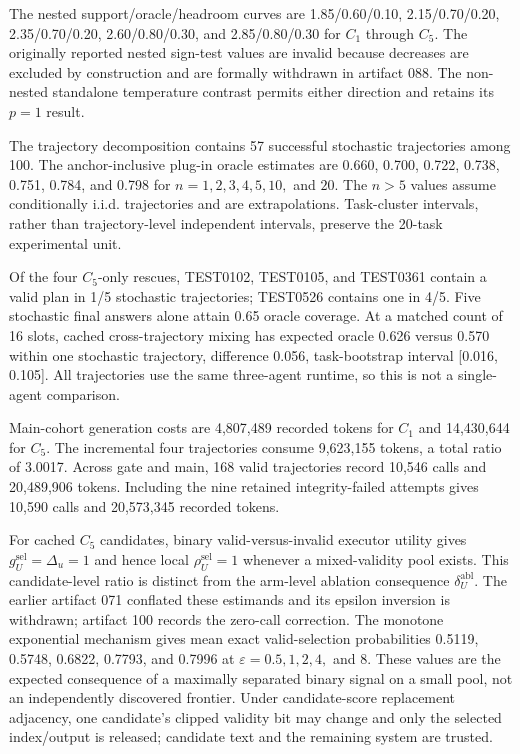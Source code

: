 The nested support/oracle/headroom curves are 1.85/0.60/0.10, 2.15/0.70/0.20, 2.35/0.70/0.20, 2.60/0.80/0.30, and 2.85/0.80/0.30 for \(C_1\) through \(C_5\). The originally reported nested sign-test values are invalid because decreases are excluded by construction and are formally withdrawn in artifact 088. The non-nested standalone temperature contrast permits either direction and retains its \(p=1\) result.

The trajectory decomposition contains 57 successful stochastic trajectories among 100. The anchor-inclusive plug-in oracle estimates are 0.660, 0.700, 0.722, 0.738, 0.751, 0.784, and 0.798 for \(n=1,2,3,4,5,10,\) and \(20\). The \(n>5\) values assume conditionally i.i.d. trajectories and are extrapolations. Task-cluster intervals, rather than trajectory-level independent intervals, preserve the 20-task experimental unit.

Of the four \(C_5\)-only rescues, TEST0102, TEST0105, and TEST0361 contain a valid plan in 1/5 stochastic trajectories; TEST0526 contains one in 4/5. Five stochastic final answers alone attain 0.65 oracle coverage. At a matched count of 16 slots, cached cross-trajectory mixing has expected oracle 0.626 versus 0.570 within one stochastic trajectory, difference 0.056, task-bootstrap interval [0.016, 0.105]. All trajectories use the same three-agent runtime, so this is not a single-agent comparison.

Main-cohort generation costs are 4,807,489 recorded tokens for \(C_1\) and 14,430,644 for \(C_5\). The incremental four trajectories consume 9,623,155 tokens, a total ratio of 3.0017. Across gate and main, 168 valid trajectories record 10,546 calls and 20,489,906 tokens. Including the nine retained integrity-failed attempts gives 10,590 calls and 20,573,345 recorded tokens.

For cached \(C_5\) candidates, binary valid-versus-invalid executor utility gives \(g_U^{\mathrm{sel}}=\Delta_u=1\) and hence local \(\rho_U^{\mathrm{sel}}=1\) whenever a mixed-validity pool exists. This candidate-level ratio is distinct from the arm-level ablation consequence \(\delta_U^{\mathrm{abl}}\). The earlier artifact 071 conflated these estimands and its epsilon inversion is withdrawn; artifact 100 records the zero-call correction. The monotone exponential mechanism gives mean exact valid-selection probabilities 0.5119, 0.5748, 0.6822, 0.7793, and 0.7996 at \(\varepsilon=0.5, 1, 2, 4,\) and \(8\). These values are the expected consequence of a maximally separated binary signal on a small pool, not an independently discovered frontier. Under candidate-score replacement adjacency, one candidate's clipped validity bit may change and only the selected index/output is released; candidate text and the remaining system are trusted.

